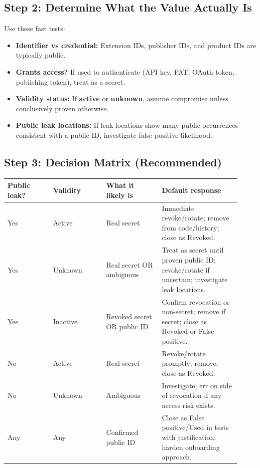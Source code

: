 \documentclass[11pt]{article}
\newcommand{\term}[1]{\textbf{#1}}
\begin{document}
\subsection{Step 2: Determine What the Value Actually Is}
Use these fast tests:
\begin{itemize}
  \item \textbf{Identifier vs credential:} Extension IDs, publisher IDs, and product IDs are typically public.
  \item \textbf{Grants access?} If used to authenticate (API key, PAT, OAuth token, publishing token), treat as a secret.
  \item \textbf{Validity status:} If \term{active} or \term{unknown}, assume compromise unless conclusively proven otherwise.
  \item \textbf{Public leak locations:} If leak locations show many public occurrences consistent with a public ID, investigate false positive likelihood.
\end{itemize}

\subsection{Step 3: Decision Matrix (Recommended)}
\begin{longtable}{@{}p{0.18\linewidth}p{0.21\linewidth}p{0.22\linewidth}p{0.31\linewidth}@{}}
\toprule
\textbf{Public leak?} & \textbf{Validity} & \textbf{What it likely is} & \textbf{Default response} \\
\midrule
Yes & Active & Real secret & Immediate revoke/rotate; remove from code/history; close as Revoked. \\
Yes & Unknown & Real secret OR ambiguous & Treat as secret until proven public ID; revoke/rotate if uncertain; investigate leak locations. \\
Yes & Inactive & Revoked secret OR public ID & Confirm revocation or non-secret; remove if secret; close as Revoked or False positive. \\
No & Active & Real secret & Revoke/rotate promptly; remove; close as Revoked. \\
No & Unknown & Ambiguous & Investigate; err on side of revocation if any access risk exists. \\
Any & Any & Confirmed public ID & Close as False positive/Used in tests with justification; harden onboarding approach. \\
\bottomrule
\end{longtable}
\end{document}
